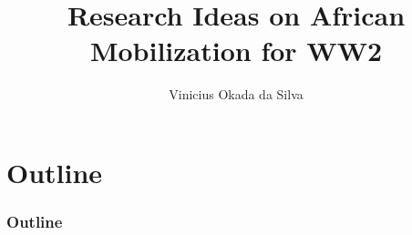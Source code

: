 \documentclass[aspectratio=1610]{beamer}
\title{Research Ideas on African Mobilization for WW2}
\author{Vinicius Okada da Silva}
\institute{University of Illinois at Urbana-Champaign}
\date{}
\begin{document}
\begin{frame}
	\titlepage
\end{frame}

\section*{Outline}

\begin{frame}
\frametitle{Outline}
\begin{singlespace} 
\tableofcontents
\end{singlespace}
\end{frame}
\end{document}
